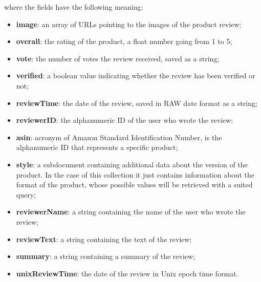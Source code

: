 where the fields have the following meaning:
\begin{itemize}
    \item \textbf{image}: an array of URLs pointing to the images of the product review;
    \item \textbf{overall}: the rating of the product, a float number going from 1 to 5;
    \item \textbf{vote}: the number of votes the review received, saved as a string;
    \item \textbf{verified}: a boolean value indicating whether the review has been verified or not;
    \item \textbf{reviewTime}: the date of the review, saved in RAW date format as a string;
    \item \textbf{reviewerID}: the alphanumeric ID of the user who wrote the review;
    \item \textbf{asin}: acronym of Amazon Standard Identification Number, is the alphanumeric ID that represents a specific product;
    \item \textbf{style}: a subdocument containing additional data about the version of the product. In the case of this collection it just contains information about the format of the product, whose possible values will be retrieved with a suited query;
    \item \textbf{reviewerName}: a string containing the name of the user who wrote the review;
    \item \textbf{reviewText}: a string containing the text of the review;
    \item \textbf{summary}: a string containing a summary of the review;
    \item \textbf{unixReviewTime}: the date of the review in Unix epoch time format.
\end{itemize}